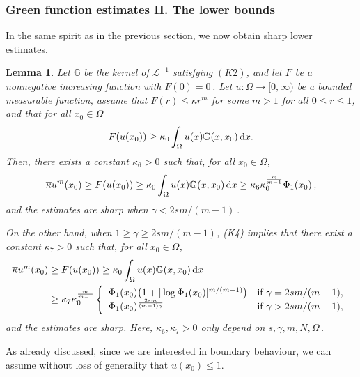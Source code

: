 \documentclass[11pt]{article}
\newtheorem{lem}[thm]{Lemma}
\numberwithin{equation}{section}
\newcommand{\dx}{\,{\rm d}x}
\newcommand{\AI}{\mathcal{L}^{-1}}
\newcommand{\n}{F}
\newcommand{\ka}{\overline{\kappa}}
\newcommand{\K}{{\mathbb G}}
\begin{document}

\subsubsection{Green function estimates II. The lower bounds}
In the same spirit as in the previous section, we now obtain sharp lower estimates.

\begin{lem}\label{Lem.Green.3}Let $\K$ be the kernel of $\AI$ satisfying $(K2)$, and let $F$ be a nonnegative increasing function with $\n(0)=0$\,.
Let $u:\Omega \to [0,\infty)$ be a bounded measurable function, assume that  $F(r)\le \ka r^m$ for some $m>1$ for all $0\leq r\leq 1$, and that for all $x_0\in\Omega$
\begin{equation}\label{Lem.Green.3.hyp}
\n(u(x_0))\ge \kappa_0\int_{\Omega} u(x)\K(x,x_0)\dx.
\end{equation}
Then, there exists a constant $\kappa_{6}>0$ such that, for all $x_0\in \Omega$,
\begin{equation}\label{Lem.Green.3.est.Lower.II}
  \ka u^m(x_0) \ge \n(u(x_0))
\ge \kappa_0\int_{\Omega} u(x)\K(x,x_0)\dx\ge \kappa_6\kappa_0^{\frac{m}{m-1}} \Phi_1(x_0)\,,
\end{equation}
and the estimates are sharp when $\gamma< 2s m/(m-1)$\,.

On the other hand, when $1\ge \gamma\geq  2s m/(m-1)$, (K4) implies that there exist a constant $\kappa_7>0$ such that, for all $x_0\in \Omega$,
\begin{equation*}
\begin{split}
  \ka u^m(x_0) &\ge \n(u(x_0))
\ge \kappa_0\int_{\Omega} u(x)\K(x,x_0)\dx\\
&\ge
\kappa_{7} \kappa_0^{\frac{m}{m-1}}
\left\{
\begin{array}{ll}
\Phi_1(x_0)\big(1+|\log \Phi_1(x_0)|^{m/(m-1)}\big)&\text{if $\gamma= 2s m/(m-1)$},\\
\Phi_1(x_0)^{\frac{2sm}{(m-1)\gamma}}&\text{if $\gamma> 2s m/(m-1)$},\\
\end{array}
\right.
\end{split}
\end{equation*}
and the estimates are sharp. Here, $\kappa_6,\kappa_7>0$ only depend on $s,\gamma, m, N,\Omega$\,.
\end{lem}
As already discussed, since we are interested in boundary behaviour, we can assume without loss of generality that $u(x_0)\le 1$.
\end{document}

